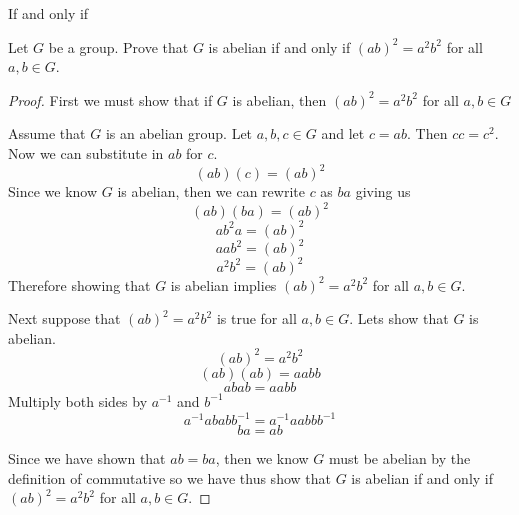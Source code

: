 If and only if

Let $G$ be a group.  Prove that $G$ is abelian if and only if $(ab)^2=a^2b^2$ for all $a,b\in G$. 

\begin{proof} First we must show that if $G$ is abelian, then $(ab)^2=a^2b^2$ for all $a,b\in G$


Assume that $G$ is an abelian group. Let $a,b,c \in G$ and let $c = ab$. Then $cc = c^2$. Now we can substitute in $ab$ for $c$.
$$(ab)(c) = (ab)^2 $$ Since we know $G$ is abelian, then we can rewrite $c$ as $ba$ giving us $$(ab)(ba) = (ab)^2 $$ $$ab^2a = (ab)^2$$ $$ aab^2 = (ab)^2$$ $$a^2b^2 = (ab)^2$$ Therefore showing that $G$ is abelian implies $(ab)^2=a^2b^2$ for all $a,b\in G$.

Next suppose that $(ab)^2=a^2b^2$ is true for all $a,b\in G$. Lets show that $G$ is abelian.
$$ (ab)^2 = a^2b^2 $$
$$(ab)(ab) = aabb $$
$$abab = aabb $$ Multiply both sides by $a^{-1}$ and $b^{-1}$
$$a^{-1}abab b^{-1} = a^{-1}aabb b^{-1}$$
$$ ba = ab$$

Since we have shown that $ab = ba$, then we know $G$ must be abelian by the definition of commutative so we have thus show that $G$ is abelian if and only if $(ab)^2=a^2b^2$ for all $a,b\in G$.
\end{proof}